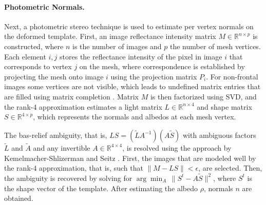 \paragraph*{Photometric Normals.} Next, a photometric stereo technique \cite{Kemelmacher-Shlizerman:2011:FRW} is used to estimate per vertex normals on the deformed template. First, an image reflectance intensity matrix $M \in \mathbb{R}^{n \times p}$ is constructed, where $n$ is the number of images and $p$ the number of mesh vertices. Each element $i,j$ stores the reflectance intensity of the pixel in image $i$ that corresponds to vertex $j$ on the mesh, where correspondence is established by projecting the mesh onto image $i$ using the projection matrix $P_i$. For non-frontal images some vertices are not visible, which leads to undefined matrix entries that are filled using matrix completion \cite{Lin09}. Matrix $M$ is then factorized using SVD, and the rank-4 approximation estimates a light matrix $L \in \mathbb{R}^{n \times 4}$ and shape matrix $S \in \mathbb{R}^{4 \times p}$, which represents the normals and albedos at each mesh vertex. 

The bas-relief ambiguity, that is, $LS=(\tilde{L}A^{-1})(A\tilde{S})$ with ambiguous factors $\tilde{L}$ and $\tilde{A}$ and any invertible $A \in \mathbb{R}^{4 \times 4}$, is resolved using the approach by Kemelmacher-Shlizerman and Seitz \cite{Kemelmacher-Shlizerman:2011:FRW}. First, the images that are modeled well by the rank-4 approximation, that is, such that $\|M-LS\|<\epsilon$, are selected. Then, the ambiguity is recovered by solving for $\arg\min_A\,\|S^{t} - A\tilde{S}\|^2 $, where $S^{t}$ is the shape vector of the template. After estimating the albedo $\rho$, normals $n$ are obtained. 


